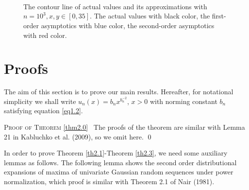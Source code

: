 \documentclass[10pt,twosided]{article}
\numberwithin{equation}{section}
\numberwithin{equation}{section}
\newcommand{\prooftheo}[1]{ \textsc{Proof of Theorem} \ref{#1} }
\begin{document}
\begin{figure}\label{fig2}
\begin{center}
%
%
                   \\
%
                   \\
%
                   \\
%
\caption{The contour line of actual values and its approximations with $n=10^{3},
x,y\in [0,35]$. The actual values with black color, the first-order
asymptotics with blue color, the second-order asymptotics with red
color.}
\end{center}
\end{figure}



\section{Proofs}\label{sec3}

The aim of this section is to prove our main results.
Hereafter, for notational simplicity we shall write $u_n(x)=b_nx^{b_n^{-2}}$, $x>0$
with norming constant $b_n$ satisfying equation \eqref{eq1.2}.


\prooftheo{thm2.0}~The proofs of the theorem are similar with Lemma 21 in Kabluchko et al. (2009), so we omit here.
\qed

In order to prove Theorem \ref{th2.1}-Theorem \ref{th2.3}, we need some auxiliary lemmas as follows.
The following lemma shows the second order distributional expansions of maxima of
univariate Gaussian random sequences under power normalization, which proof is similar with Theorem 2.1 of Nair (1981).
\end{document}
